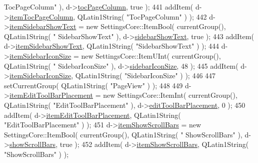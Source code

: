 \begin{DoxyCode}
{      TocPageColumn"} ), d->\hyperlink{classOkular_1_1SettingsPrivate_a61bcaf2845f9e0d30cb834d25a96394a}{tocPageColumn}, \textcolor{keyword}{true} );
441   addItem( d->\hyperlink{classOkular_1_1SettingsPrivate_ab294003c378fb7baf06b6de74950a085}{itemTocPageColumn}, QLatin1String( \textcolor{stringliteral}{"TocPageColumn"} ) );
442   d->\hyperlink{classOkular_1_1SettingsPrivate_ae1d4c31efa5f316584412c99d6e10bff}{itemSidebarShowText} = \textcolor{keyword}{new} SettingsCore::ItemBool( currentGroup(), QLatin1String( \textcolor{stringliteral}{"
      SidebarShowText"} ), d->\hyperlink{classOkular_1_1SettingsPrivate_aa08cf64b458c6e54684a87ca6705501c}{sidebarShowText}, \textcolor{keyword}{true} );
443   addItem( d->\hyperlink{classOkular_1_1SettingsPrivate_ae1d4c31efa5f316584412c99d6e10bff}{itemSidebarShowText}, QLatin1String( \textcolor{stringliteral}{"SidebarShowText"} ) );
444   d->\hyperlink{classOkular_1_1SettingsPrivate_a215c33520932cea9ea809c3434198080}{itemSidebarIconSize} = \textcolor{keyword}{new} SettingsCore::ItemUInt( currentGroup(), QLatin1String( \textcolor{stringliteral}{"
      SidebarIconSize"} ), d->\hyperlink{classOkular_1_1SettingsPrivate_aaf8c234fb36d75db4b97f0f46f0828b7}{sidebarIconSize}, 48 );
445   addItem( d->\hyperlink{classOkular_1_1SettingsPrivate_a215c33520932cea9ea809c3434198080}{itemSidebarIconSize}, QLatin1String( \textcolor{stringliteral}{"SidebarIconSize"} ) );
446 
447   setCurrentGroup( QLatin1String( \textcolor{stringliteral}{"PageView"} ) );
448 
449   d->\hyperlink{classOkular_1_1SettingsPrivate_a75b021bc97a8a2eb940ff849575e3c5c}{itemEditToolBarPlacement} = \textcolor{keyword}{new} SettingsCore::ItemInt( currentGroup(), 
      QLatin1String( \textcolor{stringliteral}{"EditToolBarPlacement"} ), d->\hyperlink{classOkular_1_1SettingsPrivate_a007a9a6e82a2d2dbd373c072a6aecce6}{editToolBarPlacement}, 0 );
450   addItem( d->\hyperlink{classOkular_1_1SettingsPrivate_a75b021bc97a8a2eb940ff849575e3c5c}{itemEditToolBarPlacement}, QLatin1String( \textcolor{stringliteral}{"EditToolBarPlacement"} ) );
451   d->\hyperlink{classOkular_1_1SettingsPrivate_af6978684b7cec666e2687e10cea23584}{itemShowScrollBars} = \textcolor{keyword}{new} SettingsCore::ItemBool( currentGroup(), QLatin1String( \textcolor{stringliteral}{"
      ShowScrollBars"} ), d->\hyperlink{classOkular_1_1SettingsPrivate_a9d05cb4daab39a953cbd862bff2fe47c}{showScrollBars}, \textcolor{keyword}{true} );
452   addItem( d->\hyperlink{classOkular_1_1SettingsPrivate_af6978684b7cec666e2687e10cea23584}{itemShowScrollBars}, QLatin1String( \textcolor{stringliteral}{"ShowScrollBars"} ) );

\end{DoxyCode}

